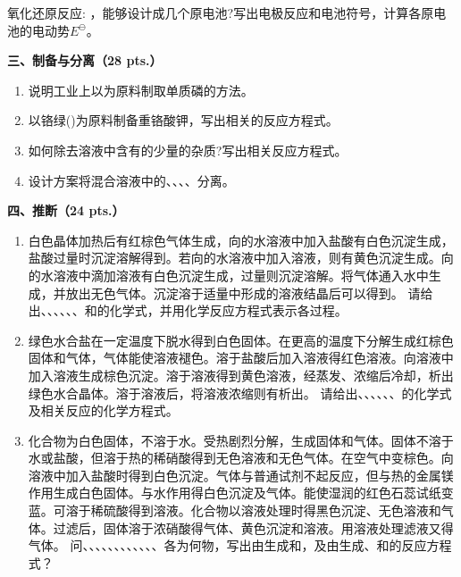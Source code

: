 \begin{enumerate}[label=\arabic*., start=1, itemsep=1.5ex]
    氧化还原反应: ，能够设计成几个原电池?写出电极反应和电池符号，计算各原电池的电动势$E^\ominus$。
\end{enumerate}

\vspace{0.5cm}
\noindent\textbf{三、制备与分离（28 pts.）}

\begin{enumerate}[label=\arabic*., start=1, itemsep=1.5ex]
    \item 说明工业上以为原料制取单质磷的方法。
    \item 以铬绿()为原料制备重铬酸钾，写出相关的反应方程式。
    \item 如何除去溶液中含有的少量的杂质?写出相关反应方程式。
    \item 设计方案将混合溶液中的、、、、分离。
\end{enumerate}

\vspace{0.5cm}
\noindent\textbf{四、推断（24 pts.）}

\begin{enumerate}[label=\arabic*., start=1, itemsep=1.5ex]
    \item 白色晶体加热后有红棕色气体生成，向的水溶液中加入盐酸有白色沉淀生成，盐酸过量时沉淀溶解得到。若向的水溶液中加入溶液，则有黄色沉淀生成。向的水溶液中滴加溶液有白色沉淀生成，过量则沉淀溶解。将气体通入水中生成，并放出无色气体。沉淀溶于适量中形成的溶液结晶后可以得到。
    请给出、、、、、、和的化学式，并用化学反应方程式表示各过程。
    \item 绿色水合盐在一定温度下脱水得到白色固体。在更高的温度下分解生成红棕色固体和气体，气体能使溶液褪色。溶于盐酸后加入溶液得红色溶液。向溶液中加入溶液生成棕色沉淀。溶于溶液得到黄色溶液，经蒸发、浓缩后冷却，析出绿色水合晶体。溶于溶液后，将溶液浓缩则有析出。
    请给出、、、、、、的化学式及相关反应的化学方程式。
    \item 化合物为白色固体，不溶于水。受热剧烈分解，生成固体和气体。固体不溶于水或盐酸，但溶于热的稀硝酸得到无色溶液和无色气体。在空气中变棕色。向溶液中加入盐酸时得到白色沉淀。气体与普通试剂不起反应，但与热的金属镁作用生成白色固体。与水作用得白色沉淀及气体。能使湿润的红色石蕊试纸变蓝。可溶于稀硫酸得到溶液。化合物以溶液处理时得黑色沉淀、无色溶液和气体。过滤后，固体溶于浓硝酸得气体、黄色沉淀和溶液。用溶液处理滤液又得气体。
    问、、、、、、、、、、、、各为何物，写出由生成和，及由生成、和的反应方程式？
\end{enumerate}